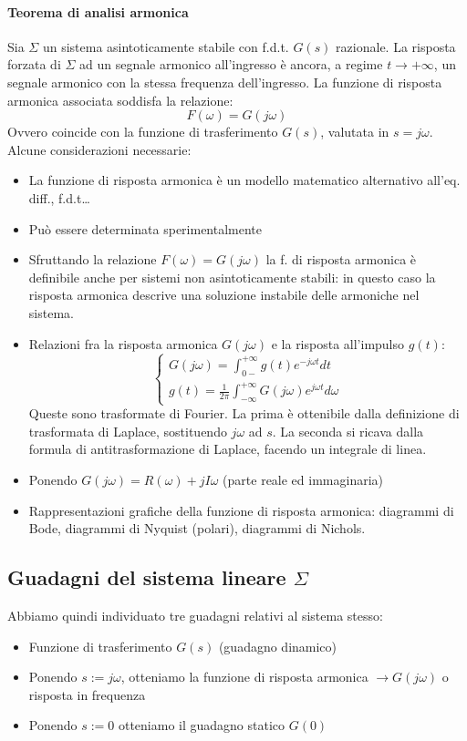 \documentclass[11pt]{article}
\begin{document}
\paragraph{Teorema di analisi armonica}
Sia $\Sigma$ un sistema asintoticamente stabile con f.d.t. $G(s)$ razionale. La risposta forzata di $\Sigma$ ad un segnale armonico all'ingresso è ancora, a regime $t\rightarrow+\infty$, un segnale armonico con la stessa frequenza dell'ingresso. La funzione di risposta armonica associata soddisfa la relazione:
\begin{displaymath}
    F(\omega) = G(j\omega)
\end{displaymath}
Ovvero coincide con la funzione di trasferimento $G(s)$, valutata in $s=j\omega$.
Alcune considerazioni necessarie:
\begin{itemize}
    \item La funzione di risposta armonica è un modello matematico alternativo all'eq. diff., f.d.t\dots 
    \item Può essere determinata sperimentalmente
    \item Sfruttando la relazione $F(\omega) = G(j\omega)$ la f. di risposta armonica è definibile anche per sistemi non asintoticamente stabili: in questo caso la risposta armonica descrive una soluzione instabile delle armoniche nel sistema.
    \item Relazioni fra la risposta armonica $G(j\omega)$ e la risposta all'impulso $g(t)$:\begin{displaymath}
        \begin{cases}
            G(j\omega) = \int_{0-}^{+\infty} g(t)e^{-j\omega t}dt \\
            g(t) = \frac{1}{2\pi}\int_{-\infty}^{+\infty} G(j\omega)e^{j\omega t}d\omega
        \end{cases}
    \end{displaymath}
    Queste sono trasformate di Fourier. La prima è ottenibile dalla definizione di trasformata di Laplace, sostituendo $j\omega$ ad $s$. La seconda si ricava dalla formula di antitrasformazione di Laplace, facendo un integrale di linea. 
    \item Ponendo $G(j\omega) = R(\omega) + jI\omega$ (parte reale ed immaginaria) 
    \item Rappresentazioni grafiche della funzione di risposta armonica: diagrammi di Bode, diagrammi di Nyquist (polari), diagrammi di Nichols.
\end{itemize}

\subsection{Guadagni del sistema lineare $\Sigma$}
Abbiamo quindi individuato tre guadagni relativi al sistema stesso:
\begin{itemize}
    \item Funzione di trasferimento $G(s)$ (guadagno dinamico)
    \item Ponendo $s:=j\omega$, otteniamo la funzione di risposta armonica $\rightarrow G(j\omega)$ o risposta in frequenza 
    \item Ponendo $s:=0$ otteniamo il guadagno statico $G(0)$
\end{itemize}
\end{document}
